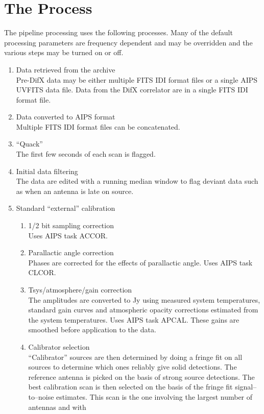 \documentclass[11pt]{article}
\begin{document}
\section{The Process}

The pipeline processing uses the following processes.
Many of the default processing parameters are frequency dependent and
may be overridden and the various steps may be turned on or off.

\begin{enumerate}
\item Data retrieved from the archive\\
Pre-DifX data may be either multiple FITS IDI format files or a single
AIPS UVFITS data file.
Data from the DifX correlator are in a single FITS IDI format file.
\item Data converted to AIPS format\\
Multiple  FITS IDI format files can be concatenated.
\item ``Quack''\\
The first few seconds of each scan is flagged.
\item Initial data filtering \\
The data are edited with a running median window to flag deviant data
such as when an antenna is late on source.
\item Standard ``external'' calibration
\begin {enumerate}
\item 1/2 bit sampling correction\\
Uses AIPS task ACCOR.
\item Parallactic angle correction\\
Phases are corrected for the effects of parallactic angle.
Uses AIPS task CLCOR.
\item Tsys/atmosphere/gain correction\\
The amplitudes are converted to Jy using measured system temperatures,
standard gain curves and atmospheric opacity corrections estimated
from the system temperatures.
Uses AIPS task APCAL.
These gains are smoothed before application to the data.
\item Calibrator selection\\
``Calibrator'' sources are then determined by doing a fringe fit on
all sources to determine which ones reliably give solid detections.
The reference antenna is picked on the basis of strong source
detections.
The best calibration scan is then selected on the basis of the fringe
fit signal--to--noise estimates.
This scan is the one involving the largest number of antennas and with

\end{enumerate}
\end{enumerate}
\end{document}
